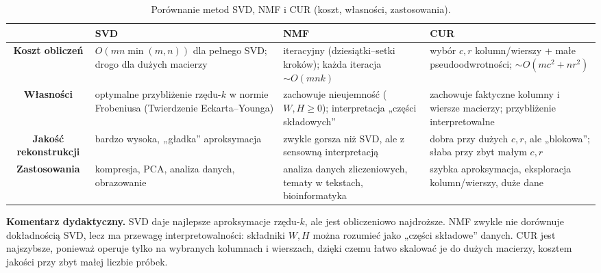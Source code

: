 \documentclass[12pt]{article}
\begin{document}
\begin{table}[h]
\centering
\renewcommand{\arraystretch}{1.3}
\begin{tabularx}{\textwidth}{|c|X|X|X|}
\hline
 & \textbf{SVD} & \textbf{NMF} & \textbf{CUR} \\
\hline
\textbf{Koszt obliczeń} 
& $O(mn\min(m,n))$ dla pełnego SVD; drogo dla dużych macierzy 
& iteracyjny (dziesiątki--setki kroków); każda iteracja $\sim O(mnk)$ 
& wybór $c,r$ kolumn/wierszy + małe pseudoodwrotności; $\sim O(mc^2+nr^2)$ \\
\hline
\textbf{Własności} 
& optymalne przybliżenie rzędu-$k$ w normie Frobeniusa (Twierdzenie Eckarta--Younga) 
& zachowuje nieujemność ($W,H\ge 0$); interpretacja „części składowych” 
& zachowuje faktyczne kolumny i wiersze macierzy; przybliżenie interpretowalne \\
\hline
\textbf{Jakość rekonstrukcji} 
& bardzo wysoka, „gładka” aproksymacja 
& zwykle gorsza niż SVD, ale z sensowną interpretacją 
& dobra przy dużych $c,r$, ale „blokowa”; słaba przy zbyt małym $c,r$ \\
\hline
\textbf{Zastosowania} 
& kompresja, PCA, analiza danych, obrazowanie 
& analiza danych zliczeniowych, tematy w tekstach, bioinformatyka 
& szybka aproksymacja, eksploracja kolumn/wierszy, duże dane \\
\hline
\end{tabularx}
\caption{Porównanie metod SVD, NMF i CUR (koszt, własności, zastosowania).}
\end{table}

\noindent\textbf{Komentarz dydaktyczny.} 
SVD daje najlepsze aproksymacje rzędu-$k$, ale jest obliczeniowo najdroższe. 
NMF zwykle nie dorównuje dokładnością SVD, lecz ma przewagę interpretowalności: 
składniki $W,H$ można rozumieć jako „części składowe” danych. 
CUR jest najszybsze, ponieważ operuje tylko na wybranych kolumnach i wierszach, 
dzięki czemu łatwo skalować je do dużych macierzy, kosztem jakości przy zbyt małej liczbie próbek.
\end{document}
